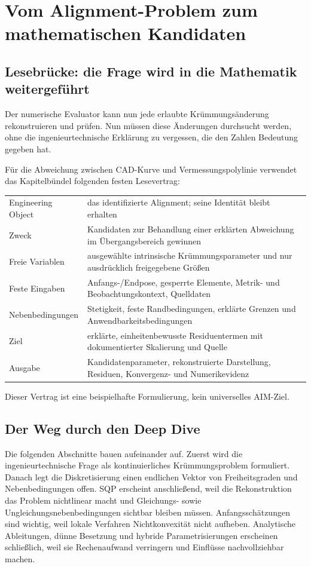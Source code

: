 \chapter{Vom Alignment-Problem zum mathematischen Kandidaten}

\section*{Lesebrücke: die Frage wird in die Mathematik weitergeführt}

Der numerische Evaluator kann nun jede erlaubte Krümmungsänderung
rekonstruieren und prüfen. Nun müssen diese Änderungen durchsucht werden, ohne
die ingenieurtechnische Erklärung zu vergessen, die den Zahlen Bedeutung
gegeben hat.

Für die Abweichung zwischen CAD-Kurve und Vermessungspolylinie verwendet das
Kapitelbündel folgenden festen Lesevertrag:
\begin{center}
\begin{tabular}{p{}p{}}
\toprule
Engineering Object & das identifizierte Alignment; seine Identität bleibt erhalten\\
Zweck & Kandidaten zur Behandlung einer erklärten Abweichung im Übergangsbereich gewinnen\\
Freie Variablen & ausgewählte intrinsische Krümmungsparameter und nur ausdrücklich freigegebene Größen\\
Feste Eingaben & Anfangs-/Endpose, gesperrte Elemente, Metrik- und Beobachtungskontext, Quelldaten\\
Nebenbedingungen & Stetigkeit, feste Randbedingungen, erklärte Grenzen und Anwendbarkeitsbedingungen\\
Ziel & erklärte, einheitenbewusste Residuentermen mit dokumentierter Skalierung und Quelle\\
Ausgabe & Kandidatenparameter, rekonstruierte Darstellung, Residuen, Konvergenz- und Numerikevidenz\\
\bottomrule
\end{tabular}
\end{center}
Dieser Vertrag ist eine beispielhafte Formulierung, kein universelles AIM-Ziel.

\section*{Der Weg durch den Deep Dive}

Die folgenden Abschnitte bauen aufeinander auf. Zuerst wird die
ingenieurtechnische Frage als kontinuierliches Krümmungsproblem formuliert.
Danach legt die Diskretisierung einen endlichen Vektor von Freiheitsgraden und
Nebenbedingungen offen. SQP erscheint anschließend, weil die Rekonstruktion
das Problem nichtlinear macht und Gleichungs- sowie
Ungleichungsnebenbedingungen sichtbar bleiben müssen. Anfangsschätzungen sind
wichtig, weil lokale Verfahren Nichtkonvexität nicht aufheben. Analytische
Ableitungen, dünne Besetzung und hybride Parametrisierungen erscheinen
schließlich, weil sie Rechenaufwand verringern und Einflüsse nachvollziehbar
machen.

